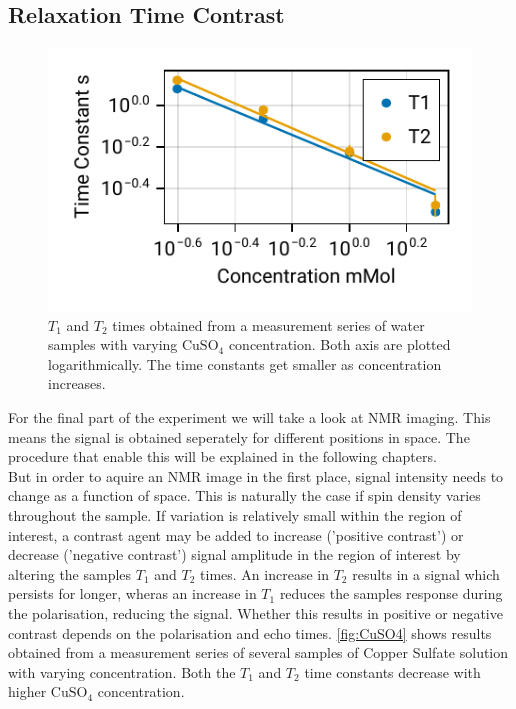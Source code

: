 \documentclass[
    parskip=half, 
    twoside=false,
    twocolumn=true,
    fontsize=11pt,
]{scrarticle}
\begin{document}
\subsection{Relaxation Time Contrast}
\begin{figure}
    \centering
    \label{fig:CuSO4}
    \includegraphics{figures/06 contrast.pdf}
    \caption{$T_1$ and $T_2$ times obtained from a measurement series of water samples with varying $\text{CuSO}_4$ concentration. Both axis are plotted logarithmically. The time constants get smaller as concentration increases.}
\end{figure}
For the final part of the experiment we will take a look at NMR imaging. This means the signal is obtained seperately for different positions in space. The procedure that enable this will be explained in the following chapters.\\
But in order to aquire an NMR image in the first place, signal intensity needs to change as a function of space. This is naturally the case if spin density varies throughout the sample. If variation is relatively small within the region of interest, a contrast agent may be added to increase ('positive contrast') or decrease ('negative contrast') signal amplitude in the region of interest by altering the samples $T_1$ and $T_2$ times. An increase in $T_2$ results in a signal which persists for longer, wheras an increase in $T_1$ reduces the samples response during the polarisation, reducing the signal. Whether this results in positive or negative contrast depends on the polarisation and echo times. \autoref{fig:CuSO4} shows results obtained from a measurement series of several samples of Copper Sulfate solution with varying concentration. Both the $T_1$ and $T_2$ time constants decrease with higher $\text{CuSO}_4$ concentration.
\end{document}
